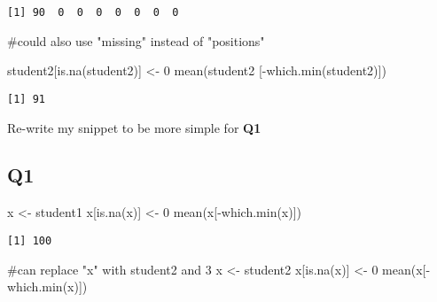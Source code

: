 \documentclass[
  letterpaper,
  DIV=11,
  numbers=noendperiod]{scrartcl}
\newenvironment{Shaded}{\begin{snugshade}}{\end{snugshade}}
\newcommand{\CommentTok}[1]{\textcolor[rgb]{0.37,0.37,0.37}{#1}}
\newcommand{\DecValTok}[1]{\textcolor[rgb]{0.68,0.00,0.00}{#1}}
\newcommand{\FunctionTok}[1]{\textcolor[rgb]{0.28,0.35,0.67}{#1}}
\newcommand{\NormalTok}[1]{\textcolor[rgb]{0.00,0.23,0.31}{#1}}
\newcommand{\OtherTok}[1]{\textcolor[rgb]{0.00,0.23,0.31}{#1}}
\newcommand{\SpecialCharTok}[1]{\textcolor[rgb]{0.37,0.37,0.37}{#1}}
\begin{document}
\begin{verbatim}
[1] 90  0  0  0  0  0  0  0
\end{verbatim}

\begin{Shaded}
\begin{Highlighting}[]
\CommentTok{\#could also use "missing" instead of "positions"}
\end{Highlighting}
\end{Shaded}

\begin{Shaded}
\begin{Highlighting}[]
\NormalTok{student2[}\FunctionTok{is.na}\NormalTok{(student2)] }\OtherTok{\textless{}{-}} \DecValTok{0}
\FunctionTok{mean}\NormalTok{(student2 [}\SpecialCharTok{{-}}\FunctionTok{which.min}\NormalTok{(student2)])}
\end{Highlighting}
\end{Shaded}

\begin{verbatim}
[1] 91
\end{verbatim}

Re-write my snippet to be more simple for \textbf{Q1}

\hypertarget{q1}{%
\subsection{\texorpdfstring{\textbf{Q1}}{Q1}}\label{q1}}

\begin{Shaded}
\begin{Highlighting}[]
\NormalTok{x }\OtherTok{\textless{}{-}}\NormalTok{ student1}
\NormalTok{x[}\FunctionTok{is.na}\NormalTok{(x)] }\OtherTok{\textless{}{-}} \DecValTok{0}
\FunctionTok{mean}\NormalTok{(x[}\SpecialCharTok{{-}}\FunctionTok{which.min}\NormalTok{(x)])}
\end{Highlighting}
\end{Shaded}

\begin{verbatim}
[1] 100
\end{verbatim}

\begin{Shaded}
\begin{Highlighting}[]
\CommentTok{\#can replace "x" with student2 and 3}
\NormalTok{x }\OtherTok{\textless{}{-}}\NormalTok{ student2}
\NormalTok{x[}\FunctionTok{is.na}\NormalTok{(x)] }\OtherTok{\textless{}{-}} \DecValTok{0}
\FunctionTok{mean}\NormalTok{(x[}\SpecialCharTok{{-}}\FunctionTok{which.min}\NormalTok{(x)])}
\end{Highlighting}
\end{Shaded}
\end{document}
